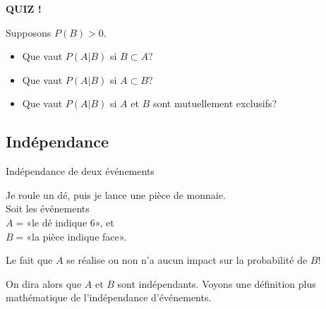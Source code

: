 \documentclass{BeamerTemplate}
\begin{document}
\begin{frame}[plain, t]%



\centerline{\LARGE\bf \alert{QUIZ !}}
\bigskip

Supposons $P(B)>0$.
\vspace{3mm}

\begin{itemize}\itemsep1.5cm
\item Que vaut $P(A|B)$ si $B\subset A$?

\item Que vaut $P(A|B)$ si $A\subset B$?

\item Que vaut $P(A|B)$ si $A$ et $B$ sont mutuellement exclusifs?
\vspace{1cm}
\end{itemize}

\end{frame}

\subsection{Indépendance}

\begin{frame}[t]{Indépendance de deux événements}

 \bigskip
 Je roule un dé, puis je lance une pièce  de monnaie. \\Soit les événements\\
  $A=$«le dé indique 6», et \\
  $B=$«la pièce indique  face». \\

  \bigskip

Le fait que $A$ se réalise ou non n'a aucun impact sur la probabilité de $B$!
\bigskip

On dira alors que $A$ et $B$ sont \alert{indépendants}. Voyons une définition plus mathématique de l'indépendance d'événements.
\end{frame}
\end{document}
